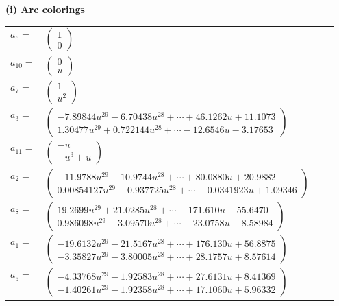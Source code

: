 \documentclass[1p]{elsarticle_modified}
\theoremstyle{definition}
\begin{document}
\flushleft \textbf{(i) Arc colorings}\\
\begin{tabular}{m{7pt} m{180pt} m{7pt} m{180pt} }
\flushright $a_{6}=$&$\begin{pmatrix}1\\0\end{pmatrix}$ \\
\flushright $a_{10}=$&$\begin{pmatrix}0\\u\end{pmatrix}$ \\
\flushright $a_{7}=$&$\begin{pmatrix}1\\u^2\end{pmatrix}$ \\
\flushright $a_{3}=$&$\begin{pmatrix}-7.89844 u^{29}-6.70438 u^{28}+\cdots+46.1262 u+11.1073\\1.30477 u^{29}+0.722144 u^{28}+\cdots-12.6546 u-3.17653\end{pmatrix}$ \\
\flushright $a_{11}=$&$\begin{pmatrix}- u\\- u^3+u\end{pmatrix}$ \\
\flushright $a_{2}=$&$\begin{pmatrix}-11.9788 u^{29}-10.9744 u^{28}+\cdots+80.0880 u+20.9882\\0.00854127 u^{29}-0.937725 u^{28}+\cdots-0.0341923 u+1.09346\end{pmatrix}$ \\
\flushright $a_{8}=$&$\begin{pmatrix}19.2699 u^{29}+21.0285 u^{28}+\cdots-171.610 u-55.6470\\0.986098 u^{29}+3.09570 u^{28}+\cdots-23.0758 u-8.58984\end{pmatrix}$ \\
\flushright $a_{1}=$&$\begin{pmatrix}-19.6132 u^{29}-21.5167 u^{28}+\cdots+176.130 u+56.8875\\-3.35827 u^{29}-3.80005 u^{28}+\cdots+28.1757 u+8.57614\end{pmatrix}$ \\
\flushright $a_{5}=$&$\begin{pmatrix}-4.33768 u^{29}-1.92583 u^{28}+\cdots+27.6131 u+8.41369\\-1.40261 u^{29}-1.92358 u^{28}+\cdots+17.1060 u+5.96332\end{pmatrix}$ \\

\end{tabular}
\end{document}
